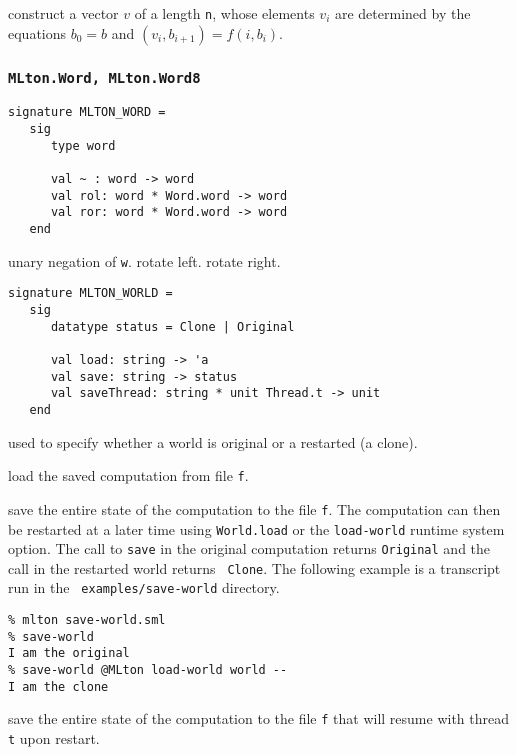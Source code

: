 \begin{description}

construct a vector $v$ of a length {\tt n}, whose elements $v_i$ are determined
by the equations $b_0 = b$ and $(v_i, b_{i+1}) = f (i, b_i)$.

\end{description}

\subsubsection{\tt MLton.Word, MLton.Word8}
\begin{verbatim}
signature MLTON_WORD =
   sig
      type word
         
      val ~ : word -> word
      val rol: word * Word.word -> word
      val ror: word * Word.word -> word
   end
\end{verbatim}

\begin{description}
unary negation of {\tt w}.
rotate left.
rotate right.
\end{description}

\begin{verbatim}
signature MLTON_WORLD =
   sig
      datatype status = Clone | Original

      val load: string -> 'a
      val save: string -> status
      val saveThread: string * unit Thread.t -> unit
   end
\end{verbatim}

\begin{description}
used to specify whether a world is original or a restarted (a clone).

load the saved computation from file {\tt f}.

save the entire state of the computation to
the file {\tt f}.  The computation can then be restarted at a later
time using {\tt World.load} or the {\tt load-world} runtime system
option.  The call to {\tt save} in the original computation returns
{\tt Original} and the call in the restarted world returns {\tt
Clone}.  The following example is a transcript run in the {\tt
examples/save-world} directory.
\begin{verbatim}
% mlton save-world.sml
% save-world
I am the original
% save-world @MLton load-world world --
I am the clone
\end{verbatim}

save the entire state of the computation to
the file {\tt f} that will resume with thread {\tt t} upon restart.

\end{description}

